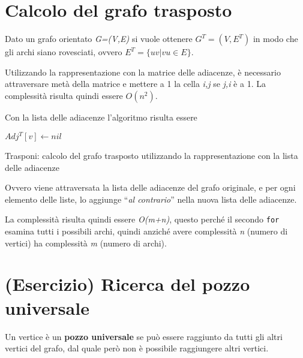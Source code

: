 \section{Calcolo del grafo trasposto}\label{calcolo-del-grafo-trasposto}

Dato un grafo orientato \emph{G=(V,E)} si vuole ottenere $ G^T = (V, E^T)$ in modo che gli archi siano rovesciati, ovvero $E^T = \{uv | vu \in E\}$.

Utilizzando la rappresentazione con la matrice delle adiacenze, è
necessario attraversare metà della matrice e mettere a 1 la cella
\emph{i,j} se \emph{j,i} è a 1. La complessità risulta quindi essere
$O(n^2)$.

Con la lista delle adiacenze l'algoritmo risulta essere


\begin{algorithm}
	\begin{algorithmic}[1]
				\State $Adj^T[v] \gets nil$
			\EndFor
					 
					 
					 
				\EndWhile
			\EndFor
		\EndFunction
	\end{algorithmic}
	\caption{Trasponi: calcolo del grafo trasposto utilizzando la rappresentazione con la lista delle adiacenze}
\end{algorithm}

Ovvero viene attraversata la lista delle adiacenze del grafo originale,
e per ogni elemento delle liste, lo aggiunge ``\emph{al contrario}''
nella nuova lista delle adiacenze.

La complessità risulta quindi essere \emph{O(m+n)}, questo perché il
secondo \texttt{for} esamina tutti i possibili archi, quindi anziché
avere complessità \emph{n} (numero di vertici) ha complessità \emph{m}
(numero di archi).

\section{(Esercizio) Ricerca del pozzo universale}\label{esericizio-ricerca-del-pozzo-universale}

Un vertice è un \textbf{pozzo universale} se può essere raggiunto da
tutti gli altri vertici del grafo, dal quale però non è possibile
raggiungere altri vertici.

